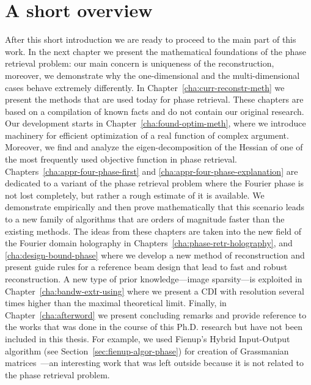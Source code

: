 \section{A short overview}
\label{sec:short-overview}
After this short introduction we are ready to proceed to the main
part of this work. In the next chapter we present the mathematical
foundations of the phase retrieval problem: our main concern is
uniqueness of the reconstruction, moreover, we demonstrate why
the one-dimensional and the multi-dimensional cases behave extremely
differently. In Chapter~\ref{cha:curr-reconstr-meth} we present the
methods that are used today for phase retrieval. These chapters are
based on a compilation of known facts and do not contain our original
research. Our development starts in
Chapter~\ref{cha:found-optim-meth}, where we introduce machinery for
efficient optimization of a real function of complex
argument. Moreover, we find and analyze the eigen-decomposition of the
Hessian of one of the most frequently used objective function in phase
retrieval. Chapters~\ref{cha:appr-four-phase-first} and
\ref{cha:appr-four-phase-explanation} are dedicated to a variant of
the phase retrieval problem where the Fourier phase is not lost
completely, but rather a rough estimate of it is available. We demonstrate
empirically and then prove mathematically that this scenario leads to
a new family of algorithms that are orders of magnitude faster than
the existing methods. The ideas from these chapters are taken into the
new field of the Fourier domain holography in
Chapters~\ref{cha:phase-retr-holography}, and
\ref{cha:design-bound-phase} where we develop a new method of
reconstruction and present guide rules for a reference beam design
that lead to fast and robust reconstruction. A new type of prior
knowledge---image sparsity---is exploited in
Chapter~\ref{cha:bandw-extr-using} where we present a CDI with
resolution several times higher than the maximal theoretical
limit. Finally, in Chapter~\ref{cha:afterword} we present concluding
remarks and provide reference to the works that was done in the course
of this Ph.D. research but have not been included in this thesis. For
example, we used Fienup's Hybrid Input-Output algorithm (see
Section~\ref{sec:fienup-algor-phase}) for creation of Grassmanian
matrices~---an interesting work
that was left outside because it is not related to the phase retrieval
problem. 


